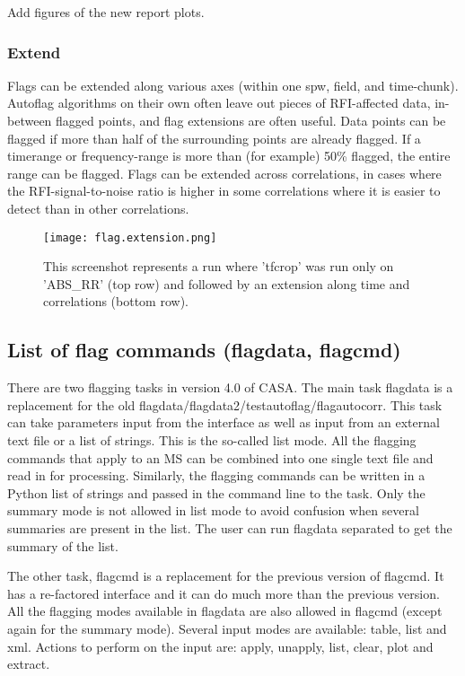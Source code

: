 {\red Add figures of the new report plots.}

\subsubsection{Extend}

Flags can be extended along various axes (within one spw, field, and time-chunk). 
Autoflag algorithms on their own often leave out pieces of RFI-affected data, in-between flagged
points, and flag extensions are often useful.  Data points can be flagged if more than half of 
the surrounding points are already flagged.  If a timerange or frequency-range is more than 
(for example) 50\% flagged, the entire range can be flagged.  Flags can be extended across
correlations, in cases where the RFI-signal-to-noise ratio is higher in some correlations where
it is easier to detect than in other correlations. 

\begin{figure}
\texttt{[image: flag.extension.png]}
\caption{This screenshot represents a run where 'tfcrop' was run only on
'ABS\_RR' (top row) and followed by an extension along time and correlations
(bottom row). }
\end{figure}




\subsection{List of flag commands (flagdata, flagcmd)}
\label{Sec:FlagCmdLists}
There are two flagging tasks in version 4.0 of CASA. The main task flagdata is
a replacement for the old flagdata/flagdata2/testautoflag/flagautocorr. This
task can take parameters input from the interface as well as input from an
external text file or a list of strings. This is the so-called list mode. All the flagging commands
that apply to an MS can be combined into one single text file and read in for
processing. Similarly, the flagging commands can be written in a Python list of strings
and passed in the command line to the task. Only the summary mode is not allowed in list mode to avoid
confusion when several summaries are present in the list. The user can run
flagdata separated to get the summary of the list. 

The other task, flagcmd is a replacement for the previous version of flagcmd. It
has a re-factored interface and it can do much more than the previous version.
All the flagging modes available in flagdata are also allowed in flagcmd
(except again for the summary mode). Several input modes are available: table,
list and xml. Actions to perform on the input are: apply, unapply, list,
clear, plot and extract.

